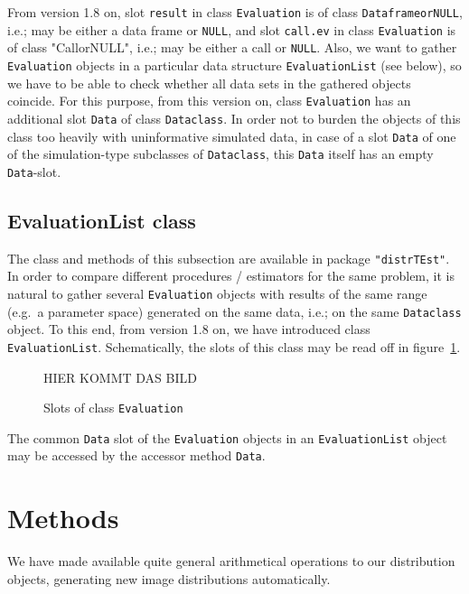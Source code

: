 \documentclass[11pt]{article}
\newcommand{\code}[1]{{\tt #1}}
\newcommand{\pkg}[1]{{\tt "#1"}}
\begin{document}
From version 1.8 on, slot \code{result} in class \code{Evaluation} is of class \code{DataframeorNULL},
i.e.; may be either a data frame or {\tt NULL}, and slot \code{call.ev} in class \code{Evaluation}
is of class "CallorNULL", i.e.; may be either a call or {\tt NULL}.
Also, we want to gather \code{Evaluation} objects in a particular data structure \code{EvaluationList}
(see below), so we have to be able to check whether all data sets in the gathered objects coincide.
For this purpose, from this version on, class \code{Evaluation} has an additional slot \code{Data} of
class \code{Dataclass}. In order not to burden the objects of this class too heavily with uninformative
simulated data, in case of a slot \code{Data} of one of the simulation-type subclasses of \code{Dataclass},
this \code{Data}  itself has an empty \code{Data}-slot.\\

\subsection{EvaluationList class}
The class and methods of this subsection are available in package  \pkg{distrTEst}. \\
In order to compare different procedures / estimators for the
same problem, it is natural to gather several \code{Evaluation} objects
with results of the same range (e.g.\ a parameter space) generated on the
same data, i.e.; on the same \code{Dataclass} object. To this end, from
version 1.8 on, we have introduced class \code{EvaluationList}.
Schematically, the slots of this class may be read off in figure~\ref{fig3c1}.
\begin{figure}[htb]\label{fig3-1}
  \begin{center}
\parbox{10cm}{HIER KOMMT DAS BILD}
    \caption{\label{fig3c1}{\footnotesize Slots of class \code{Evaluation}}}
  \end{center}
\end{figure}
The common \code{Data} slot of the \code{Evaluation} objects in an \code{EvaluationList} object
may be accessed by the accessor method \code{Data}.
%
%
\section{Methods}\label{methods}
%
We have made available quite general arithmetical operations to our distribution objects,
generating new image distributions automatically.
\end{document}
